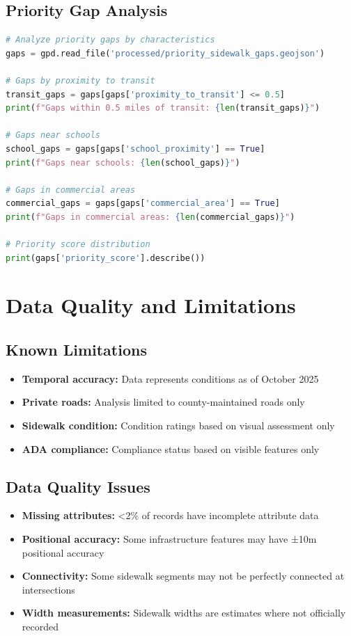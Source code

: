 \documentclass[11pt,letterpaper]{article}
\begin{document}
\subsection{Priority Gap Analysis}

\begin{lstlisting}[language=python]
# Analyze priority gaps by characteristics
gaps = gpd.read_file('processed/priority_sidewalk_gaps.geojson')

# Gaps by proximity to transit
transit_gaps = gaps[gaps['proximity_to_transit'] <= 0.5]
print(f"Gaps within 0.5 miles of transit: {len(transit_gaps)}")

# Gaps near schools
school_gaps = gaps[gaps['school_proximity'] == True]
print(f"Gaps near schools: {len(school_gaps)}")

# Gaps in commercial areas
commercial_gaps = gaps[gaps['commercial_area'] == True]
print(f"Gaps in commercial areas: {len(commercial_gaps)}")

# Priority score distribution
print(gaps['priority_score'].describe())
\end{lstlisting}

\section{Data Quality and Limitations}

\subsection{Known Limitations}

\begin{itemize}
    \item \textbf{Temporal accuracy:} Data represents conditions as of October 2025
    \item \textbf{Private roads:} Analysis limited to county-maintained roads only
    \item \textbf{Sidewalk condition:} Condition ratings based on visual assessment only
    \item \textbf{ADA compliance:} Compliance status based on visible features only
\end{itemize}

\subsection{Data Quality Issues}

\begin{itemize}
    \item \textbf{Missing attributes:} <2\% of records have incomplete attribute data
    \item \textbf{Positional accuracy:} Some infrastructure features may have ±10m positional accuracy
    \item \textbf{Connectivity:} Some sidewalk segments may not be perfectly connected at intersections
    \item \textbf{Width measurements:} Sidewalk widths are estimates where not officially recorded
\end{itemize}
\end{document}
